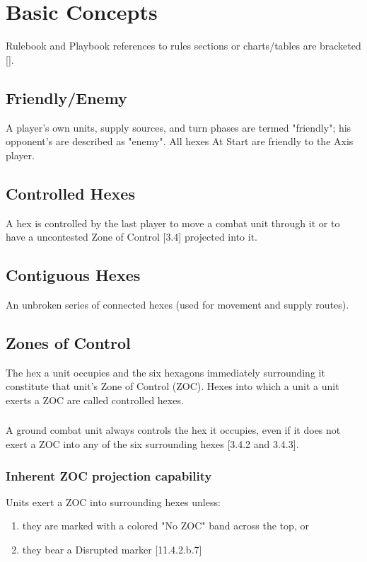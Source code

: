 \section{Basic Concepts}
Rulebook and Playbook references to rules sections or charts/tables are bracketed [].

\subsection{Friendly/Enemy}
A player's own units, supply sources, and turn phases are termed "friendly"; his opponent's are described as "enemy". All hexes At Start are friendly to the Axis player.

\subsection{Controlled Hexes}
A hex is controlled by the last player to move a combat unit through it or to have a uncontested Zone of Control [3.4] projected into it.

\subsection{Contiguous Hexes}
An unbroken series of connected hexes (used for movement and supply routes).

\subsection{Zones of Control}
The hex a unit occupies and the six hexagons immediately surrounding it constitute that unit's Zone of Control (ZOC). Hexes into which a unit a unit exerts a ZOC are called controlled hexes.

\subsubsection{}
A ground combat unit always controls the hex it occupies, even if it does not exert a ZOC into any of the six surrounding hexes [3.4.2 and 3.4.3].

\subsubsection{Inherent ZOC projection capability}
Units exert a ZOC into surrounding hexes unless:
\begin{enumerate}[label=\alph*.]
\item they are marked with a colored "No ZOC" band across the top, or
\item they bear a Disrupted marker [11.4.2.b.7]
\end{enumerate}

